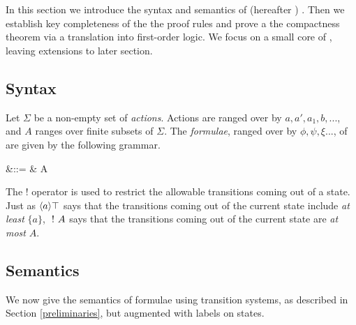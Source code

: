 \section{\ELFULL}\label{coreEL}

In this section we introduce the syntax and semantics of \ELFULL{} (hereafter \ELABR{}) .
Then we establish key completeness of the the proof rules and prove a
the compactness theorem via a translation into first-order logic. We
focus on a small core of \ELABR{}, leaving extensions to later
section.

\subsection{Syntax}



\begin{definition} Let $\Sigma$ be a non-empty set of \emph{actions}.
Actions are ranged over by $a, a', a_1, b, ...$, and $A$ ranges over
finite subsets of $\Sigma$. The \emph{formulae}, ranged over by $\phi,
\psi, \xi ...$, of \ELABR{} are given by the
following grammar.

\begin{GRAMMAR}
  \phi 
     &\quad ::= \quad & 
  \TRUE 
     \VERTICAL 
  \phi \AND \psi
     \VERTICAL 
     \VERTICAL 
  \fBang A 
\end{GRAMMAR}

\NI The $!$ operator is used to restrict the allowable transitions
coming out of a state.  
Just as $\langle a \rangle \top$ says that the transitions coming out of the current state include \emph{at least} $\{a\}$,
$\ ! \  A$ says that the transitions coming out of the current state are \emph{at most} $A$.


\end{definition}

\subsection{Semantics}

\NI We now give the semantics of \ELABR{} formulae using
transition systems, as described in Section \ref{preliminaries}, but
augmented with labels on states.


